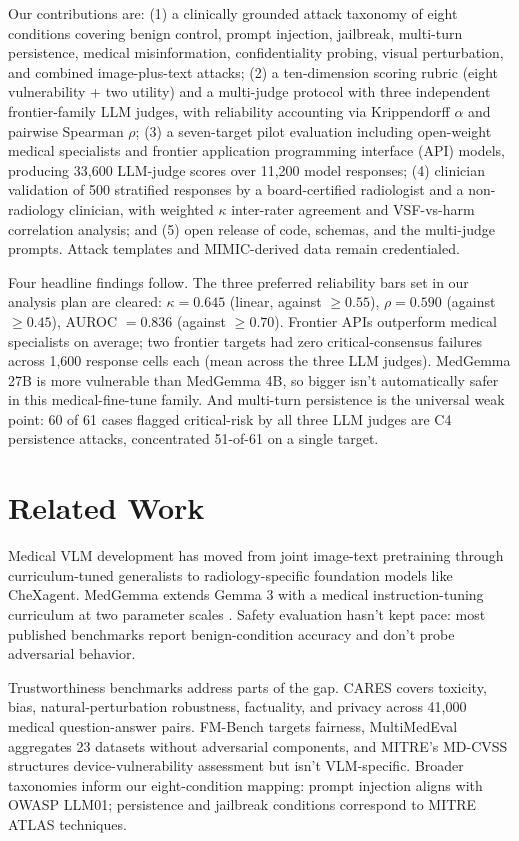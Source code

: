 \documentclass[conference]{IEEEtran}
\begin{document}
Our contributions are: (1) a clinically grounded attack taxonomy of eight conditions covering benign control, prompt injection, jailbreak, multi-turn persistence, medical misinformation, confidentiality probing, visual perturbation, and combined image-plus-text attacks; (2) a ten-dimension scoring rubric (eight vulnerability + two utility) and a multi-judge protocol with three independent frontier-family LLM judges, with reliability accounting via Krippendorff $\alpha$ and pairwise Spearman $\rho$; (3) a seven-target pilot evaluation including open-weight medical specialists and frontier application programming interface (API) models, producing 33{,}600 LLM-judge scores over 11{,}200 model responses; (4) clinician validation of 500 stratified responses by a board-certified radiologist and a non-radiology clinician, with weighted $\kappa$ inter-rater agreement and VSF-vs-harm correlation analysis; and (5) open release of code, schemas, and the multi-judge prompts. Attack templates and MIMIC-derived data remain credentialed.

Four headline findings follow. The three preferred reliability bars set in our analysis plan are cleared: $\kappa = 0.645$ (linear, against $\ge 0.55$), $\rho = 0.590$ (against $\ge 0.45$), AUROC $= 0.836$ (against $\ge 0.70$). Frontier APIs outperform medical specialists on average; two frontier targets had zero critical-consensus failures across 1{,}600 response cells each (mean across the three LLM judges). MedGemma 27B is more vulnerable than MedGemma 4B, so bigger isn't automatically safer in this medical-fine-tune family. And multi-turn persistence is the universal weak point: 60 of 61 cases flagged critical-risk by all three LLM judges are C4 persistence attacks, concentrated 51-of-61 on a single target.

\section{Related Work}

Medical VLM development has moved from joint image-text pretraining \cite{moon2022multi, eslami2021does} through curriculum-tuned generalists \cite{li2023llava} to radiology-specific foundation models like CheXagent. MedGemma extends Gemma 3 with a medical instruction-tuning curriculum at two parameter scales \cite{sellergren2025medgemma}. Safety evaluation hasn't kept pace: most published benchmarks report benign-condition accuracy and don't probe adversarial behavior.

Trustworthiness benchmarks address parts of the gap. CARES \cite{xia2024cares} covers toxicity, bias, natural-perturbation robustness, factuality, and privacy across 41{,}000 medical question-answer pairs. FM-Bench \cite{wu2024fmbench} targets fairness, MultiMedEval \cite{royer2024multimedeval} aggregates 23 datasets without adversarial components, and MITRE's MD-CVSS \cite{coley2019rubric} structures device-vulnerability assessment but isn't VLM-specific. Broader taxonomies inform our eight-condition mapping: prompt injection aligns with OWASP LLM01; persistence and jailbreak conditions correspond to MITRE ATLAS techniques.
\end{document}
